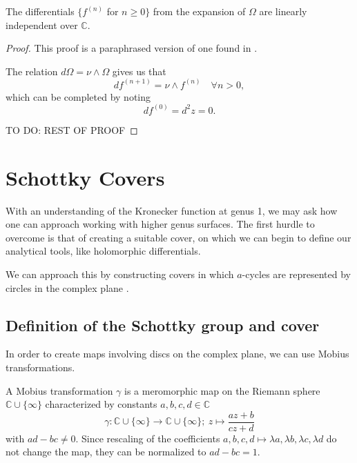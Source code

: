 \begin{lemma}
    The differentials $\{f^{(n)}$ for $n \geq 0\}$ from the expansion of $\Omega$ are linearly independent over $\mathbb C$.
\end{lemma}
\begin{proof}
    This proof is a paraphrased version of one found in \cite{BL13}.

    The relation $d\Omega = \nu \wedge \Omega$ gives us that
    \begin{equation}
        df^{(n+1)} = \nu \wedge f^{(n)} \quad \forall n > 0,
    \end{equation}
    which can be completed by noting
    \begin{equation}
        df^{(0)} = d^2 z = 0.
    \end{equation}

    TO DO: REST OF PROOF

\end{proof}

\section{Schottky Covers}\label{secB12:Schottky}

With an understanding of the Kronecker function at genus 1, we may ask how one can approach working with higher genus surfaces.
The first hurdle to overcome is that of creating a suitable cover, on which we can begin to define our analytical tools, like holomorphic differentials.

We can approach this by constructing covers in which $a$-cycles are represented by circles in the complex plane \cite{ComputationalSchottky} \cite{Cha22}.

\subsection{Definition of the Schottky group and cover}
In order to create maps involving discs on the complex plane, we can use Mobius transformations.

\begin{definition}
    A Mobius transformation $\gamma$ is a meromorphic map on the Riemann sphere $\mathbb C \cup \{\infty\}$ characterized by constants $a,b,c,d \in \mathbb C$
    \begin{equation}
        \gamma : \mathbb C \cup \{\infty\} \rightarrow \mathbb C \cup \{\infty\} ; \ z \mapsto \frac{az+b}{cz+d}
    \end{equation}
    with $ad-bc \neq 0$. Since rescaling of the coefficients $a,b,c,d\mapsto \lambda a,\lambda b, \lambda c, \lambda d$ do not change the map, they can be normalized to $ad-bc=1$.
\end{definition}


